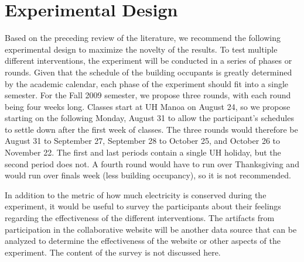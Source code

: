 \documentclass[11pt]{article}
\begin{document}
%

\section{Experimental Design}

Based on the preceding review of the literature, we recommend the following experimental design to maximize the novelty of the results. To test multiple different interventions, the experiment will be conducted in a series of phases or rounds. Given that the schedule of the building occupants is greatly determined by the academic calendar, each phase of the experiment should fit into a single semester. For the Fall 2009 semester, we propose three rounds, with each round being four weeks long. Classes start at UH Manoa on August 24, so we propose starting on the following Monday, August 31 to allow the participant's schedules to settle down after the first week of classes. The three rounds would therefore be August 31 to September 27, September 28 to October 25, and October 26 to November 22. The first and last periods contain a single UH holiday, but the second period does not. A fourth round would have to run over Thanksgiving and would run over finals week (less building occupancy), so it is not recommended.

In addition to the metric of how much electricity is conserved during the experiment, it would be useful to survey the participants about their feelings regarding the effectiveness of the different interventions. The artifacts from participation in the collaborative website will be another data source that can be analyzed to determine the effectiveness of the website or other aspects of the experiment. The content of the survey is not discussed here.

%
%
%
%
\end{document}
